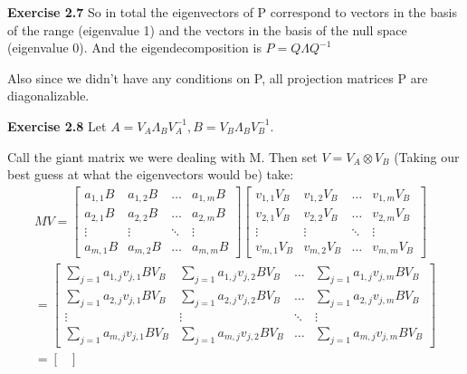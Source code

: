 \documentclass[12pt]{article}
\newenvironment{exercise}[1]{\vspace{.1in}\noindent\textbf{Exercise #1 \hspace{.05em}}}{}
\begin{document}
\begin{exercise}{2.7}
	So in total the eigenvectors of P correspond to vectors in the basis of the range (eigenvalue 1) and the vectors in the basis of the null space (eigenvalue 0). And the eigendecomposition is $P=Q\Lambda Q^{-1}$

	Also since we didn't have any conditions on P, all projection matrices P are diagonalizable.
\end{exercise}

\begin{exercise}{2.8}
	Let $A=V_A\Lambda_B V^{-1}_A,B=V_B\Lambda_BV^{-1}_B$.

	Call the giant matrix we were dealing with M. Then set $V=V_A\otimes V_B$ (Taking our best guess at what the eigenvectors would be) take:
	\begin{align}
		MV=%
		\begin{bmatrix}
			a_{1,1}B & a_{1,2}B & \dots  & a_{1,m}B \\
			a_{2,1}B & a_{2,2}B & \dots  & a_{2,m}B \\
			\vdots   & \vdots   & \ddots & \vdots   \\
			a_{m,1}B & a_{m,2}B & \dots  & a_{m,m}B
		\end{bmatrix}\begin{bmatrix}
			             v_{1,1}V_B & v_{1,2}V_B & \dots  & v_{1,m}V_B \\
			             v_{2,1}V_B & v_{2,2}V_B & \dots  & v_{2,m}V_B \\
			             \vdots     & \vdots     & \ddots & \vdots     \\
			             v_{m,1}V_B & v_{m,2}V_B & \dots  & v_{m,m}V_B
		             \end{bmatrix}                                                       \\
		=%
		\begin{bmatrix}
			\sum_{j=1}a_{1,j}v_{j,1}BV_B & \sum_{j=1}a_{1,j}v_{j,2}BV_B & \dots  & \sum_{j=1}a_{1,j}v_{j,m}BV_B \\
			\sum_{j=1}a_{2,j}v_{j,1}BV_B & \sum_{j=1}a_{2,j}v_{j,2}BV_B & \dots  & \sum_{j=1}a_{2,j}v_{j,m}BV_B \\
			\vdots                       & \vdots                       & \ddots & \vdots                       \\
			\sum_{j=1}a_{m,j}v_{j,1}BV_B & \sum_{j=1}a_{m,j}v_{j,2}BV_B & \dots  & \sum_{j=1}a_{m,j}v_{j,m}BV_B\end{bmatrix} \\
		=\begin{bmatrix}

\end{bmatrix}
\end{align}
\end{exercise}
\end{document}
